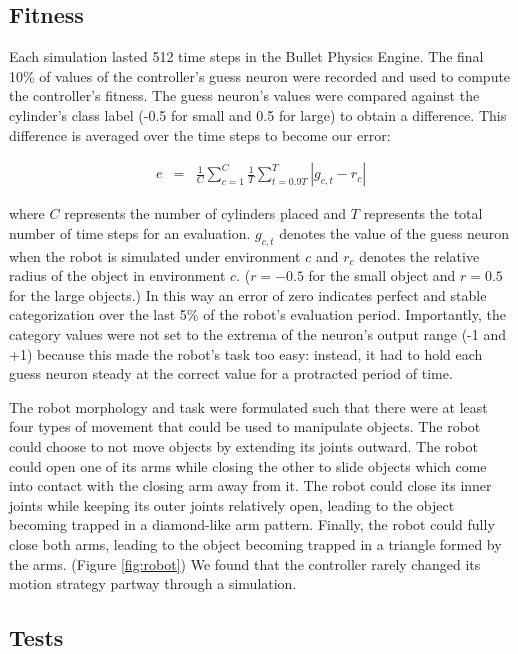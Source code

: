 \documentclass{sig-alternate}
\begin{document}
\subsection {Fitness}

Each simulation lasted 512 time steps in the Bullet Physics Engine\cite{bullet}. The final 10\% of values of the controller's guess neuron were recorded and used to compute the controller's fitness. The guess neuron's values were compared against the cylinder's class label (-0.5 for small and 0.5 for large) to obtain a difference. This difference is averaged over the time steps to become our error:

\begin {eqnarray}
  e &=& \frac{1}{C} \sum_{c=1}^{C} \frac{1}{T} \sum_{t=0.9T}^{T} \left| g_{c,t} - r_{c} \right|
\end {eqnarray}

where $C$ represents the number of cylinders placed and $T$ represents the total number of time steps for an evaluation. 
$g_{c,t}$ denotes the value of the guess neuron when the robot is simulated under environment $c$ and
$r_c$ denotes the relative radius of the object in environment $c$. ($r=-0.5$ for the small object and $r=0.5$ for the large objects.)
In this way an error of zero indicates perfect and stable categorization over the last 5\% of the robot's evaluation period.
Importantly, the category values were not set to the extrema of the neuron's output range (-1 and +1) because this made the robot's
task too easy: instead, it had to hold each guess neuron  steady at the correct value for a protracted period of time.

The robot morphology and task were formulated such that there were at least four types of movement that could be used to manipulate objects. The robot could choose to not move objects by extending its joints outward. The robot could open one of its arms while closing the other to slide objects which come into contact with the closing arm away from it. The robot could close its inner joints while keeping its outer joints relatively open, leading to the object becoming trapped in a diamond-like arm pattern. Finally, the robot could fully close both arms, leading to the object becoming trapped in a triangle formed by the arms. (Figure \ref{fig:robot}) We found that the controller rarely changed its motion strategy partway through a simulation. 

\subsection {Tests}
\end{document}
